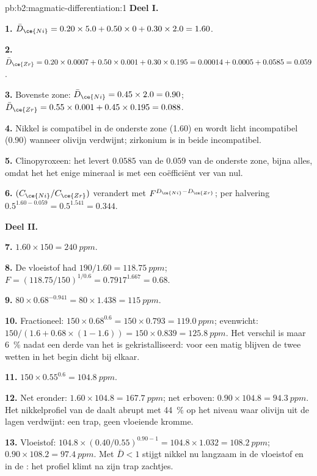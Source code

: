 \begin{solution}{pb:b2:magmatic-differentiation:1}
\noindent\textbf{Deel I.}

\textbf{1.} $\bar D_{\ce{Ni}} = 0.20\times5.0 + 0.50\times0 + 0.30\times2.0 = 1.60$.

\textbf{2.} $\bar D_{\ce{Zr}} = 0.20\times0.0007 + 0.50\times0.001 + 0.30\times0.195 =
0.00014 + 0.0005 + 0.0585 = 0.059$.

\textbf{3.} Bovenste zone: $\bar D_{\ce{Ni}} = 0.45\times2.0 = 0.90$; $\bar D_{\ce{Zr}} =
0.55\times0.001 + 0.45\times0.195 = 0.088$.

\textbf{4.} Nikkel is compatibel in de onderste zone (1.60) en wordt licht
incompatibel (0.90) wanneer olivijn verdwijnt; zirkonium is in beide incompatibel.

\textbf{5.} Clinopyroxeen: het levert $0.0585$ van de $0.059$ van de onderste zone, bijna
alles, omdat het het enige mineraal is met een coëfficiënt ver van nul.

\textbf{6.} $(C_{\ce{Ni}}/C_{\ce{Zr}})$ verandert met $F^{D_{\ce{Ni}} - D_{\ce{Zr}}}$;
per halvering $0.5^{1.60 - 0.059} = 0.5^{1.541} = 0.344$.

\noindent\textbf{Deel II.}

\textbf{7.} $1.60\times150 = \qty{240}{ppm}$.

\textbf{8.} De vloeistof had $190/1.60 = \qty{118.75}{ppm}$; $F = (118.75/150)^{1/0.6} =
0.7917^{1.667} = 0.68$.

\textbf{9.} $80\times0.68^{-0.941} = 80\times1.438 = \qty{115}{ppm}$.

\textbf{10.} Fractioneel: $150\times0.68^{0.6} = 150\times0.793 = \qty{119.0}{ppm}$;
evenwicht: $150/(1.6 + 0.68\times(1 - 1.6)) = 150\times0.839 = \qty{125.8}{ppm}$.
Het verschil is maar \qty{6}{\percent} nadat een derde van het  is
gekristalliseerd: voor een matig  blijven de twee wetten in het begin dicht bij elkaar.

\textbf{11.} $150\times0.55^{0.6} = \qty{104.8}{ppm}$.

\textbf{12.} Net eronder: $1.60\times104.8 = \qty{167.7}{ppm}$; net erboven:
$0.90\times104.8 = \qty{94.3}{ppm}$. Het nikkelprofiel van de  daalt
abrupt met \qty{44}{\percent} op het niveau waar olivijn uit de
lagen verdwijnt: een trap, geen vloeiende kromme.

\textbf{13.} Vloeistof: $104.8\times(0.40/0.55)^{0.90 - 1} = 104.8\times1.032 =
\qty{108.2}{ppm}$;  $0.90\times108.2 = \qty{97.4}{ppm}$. Met $\bar D < 1$
stijgt nikkel nu langzaam in de vloeistof en in de : het profiel klimt na zijn
trap zachtjes.


\end{solution}
